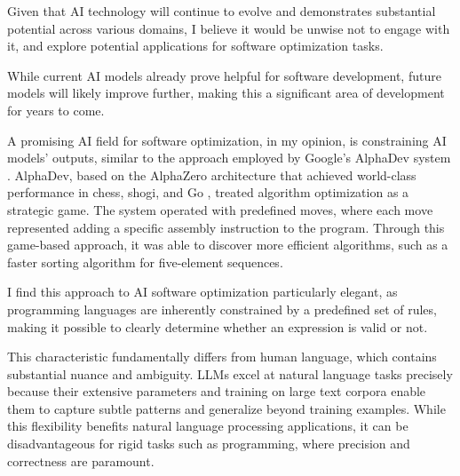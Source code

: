 Given that AI technology will continue to evolve and demonstrates substantial potential across various domains, I believe it would be unwise not to engage with it, and explore potential applications for software optimization tasks.

While current AI models already prove helpful for software development, future models will likely improve further, making this a significant area of development for years to come.

A promising AI field for software optimization, in my opinion, is constraining AI models' outputs, similar to the approach employed by Google's AlphaDev system \cite{alphadev}.
AlphaDev, based on the AlphaZero architecture that achieved world-class performance in chess, shogi, and Go \cite{alphazero}, treated algorithm optimization as a strategic game.
The system operated with predefined moves, where each move represented adding a specific assembly instruction to the program.
Through this game-based approach, it was able to discover more efficient algorithms, such as a faster sorting algorithm for five-element sequences.

I find this approach to AI software optimization particularly elegant, as programming languages are inherently constrained by a predefined set of rules, making it possible to clearly determine whether an expression is valid or not.

This characteristic fundamentally differs from human language, which contains substantial nuance and ambiguity.
LLMs excel at natural language tasks precisely because their extensive parameters and training on large text corpora enable them to capture subtle patterns and generalize beyond training examples.
While this flexibility benefits natural language processing applications, it can be disadvantageous for rigid tasks such as programming, where precision and correctness are paramount.